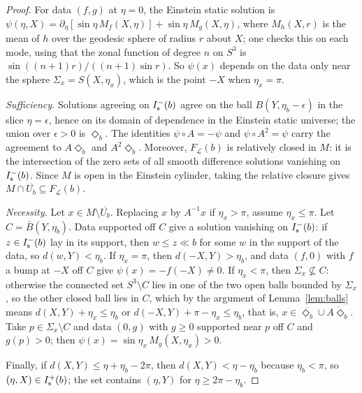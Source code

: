 \begin{proof}
For data $(f,g)$ at $\eta=0$, the Einstein static solution is
$\psi(\eta,X)=\partial_\eta[\sin\eta\,M_f(X,\eta)]+\sin\eta\,M_g(X,\eta)$, where
$M_h(X,r)$ is the mean of $h$ over the geodesic sphere of radius $r$ about
$X$; one checks this on each mode, using that the zonal function of degree $n$
on $S^3$ is $\sin((n+1)r)/((n+1)\sin r)$. So $\psi(x)$ depends on the data only
near the sphere $\Sigma_x=S(X,\eta_x)$, which is the point $-X$ when $\eta_x=\pi$.

\emph{Sufficiency.} Solutions agreeing on $I^-_{\mathrm s}(b)$ agree on the ball
$B(Y,\eta_b-\epsilon)$ in the slice $\eta=\epsilon$, hence on its domain of
dependence in the Einstein static universe; the union over $\epsilon>0$ is
$\Diamond_b$. The identities $\psi\circ A=-\psi$ and $\psi\circ A^2=\psi$ carry
the agreement to $A\Diamond_b$ and $A^2\Diamond_b$.
Moreover, $F_{\mathcal L}(b)$ is relatively closed in $M$: it is the
intersection of the zero sets of all smooth difference solutions vanishing
on $I^-_{\mathrm s}(b)$. Since $M$ is open in the Einstein cylinder, taking the relative
closure gives $M\cap\overline{U_b}\subseteq F_{\mathcal L}(b)$.

\emph{Necessity.} Let $x\in M\setminus\overline{U_b}$. Replacing $x$ by
$A^{-1}x$ if $\eta_x>\pi$, assume $\eta_x\le\pi$. Let $C=\bar B(Y,\eta_b)$.
Data supported off $C$ give a solution vanishing on $I^-_{\mathrm s}(b)$: if $z\in I^-_{\mathrm s}(b)$
lay in its support, then $w\le z\ll b$ for some $w$ in the support of the data,
so $d(w,Y)<\eta_b$. If $\eta_x=\pi$, then $d(-X,Y)>\eta_b$, and data
$(f,0)$ with $f$ a bump at $-X$ off $C$ give $\psi(x)=-f(-X)\neq0$. If
$\eta_x<\pi$, then $\Sigma_x\not\subseteq C$: otherwise the connected set
$S^3\setminus C$ lies in one of the two open balls bounded by $\Sigma_x$, so
the other closed ball lies in $C$, which by the argument of
Lemma~\ref{lem:balls} means
$d(X,Y)+\eta_x\le\eta_b$ or $d(-X,Y)+\pi-\eta_x\le\eta_b$, that is,
$x\in\overline{\Diamond_b}\cup\overline{A\Diamond_b}$. Take $p\in\Sigma_x\setminus C$
and data $(0,g)$ with $g\ge0$ supported near $p$ off $C$ and $g(p)>0$; then
$\psi(x)=\sin\eta_x\,M_g(X,\eta_x)>0$.

Finally, if $d(X,Y)\le\eta+\eta_b-2\pi$, then $d(X,Y)<\eta-\eta_b$ because
$\eta_b<\pi$, so $(\eta,X)\in I^+_{\mathrm s}(b)$; the set contains $(\eta,Y)$ for
$\eta\ge2\pi-\eta_b$.
\end{proof}


